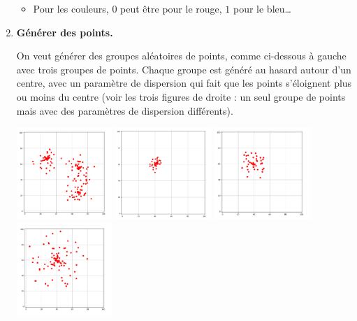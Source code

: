 \documentclass[10pt,class=report,crop=false]{standalone}
\begin{document}
\begin{activite}[Barycentres]
\begin{enumerate}
\begin{itemize}
		\item Pour les couleurs, $0$ peut être pour le rouge, $1$ pour le bleu\ldots
	\end{itemize}

	\item \textbf{Générer des points.}
	
	On veut générer des groupes aléatoires de points, comme ci-dessous à gauche avec trois groupes de points. Chaque groupe est généré au hasard autour d'un centre, avec un paramètre de dispersion qui fait que les points s'éloignent plus ou moins du centre (voir les trois figures de droite : un seul groupe de points mais avec des paramètres de dispersion différents).
	
	\begin{center}
		\includegraphics[scale=\myscale,height=3.5cm]{ecran-barycentres-2}
		\includegraphics[scale=\myscale,height=3.5cm]{ecran-barycentres-3a}
		\includegraphics[scale=\myscale,height=3.5cm]{ecran-barycentres-3b}
		\includegraphics[scale=\myscale,height=3.5cm]{ecran-barycentres-3c}
	\end{center}
	

\end{enumerate}
\end{activite}
\end{document}
